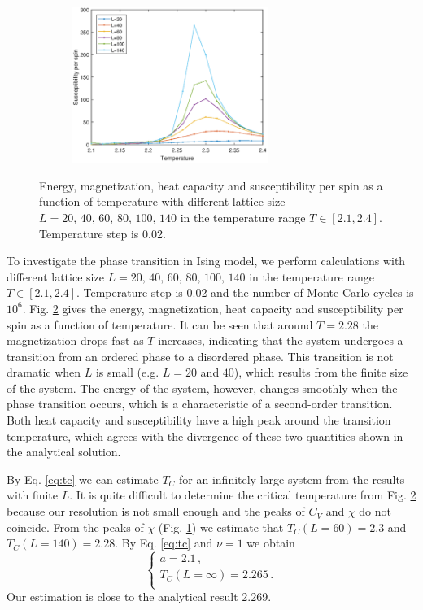 \begin{figure}[tb]
\begin{subfigure}[tb]{0.5\textwidth}
		\caption{}
	\end{subfigure}
	~
	\begin{subfigure}[tb]{0.5\textwidth}
		\centering
		\includegraphics[width=0.7\textwidth]{Tran_sus.eps}		
		\caption{}
		\label{fig:transition_sus}
	\end{subfigure}
	\caption{Energy, magnetization, heat capacity and susceptibility per spin as a function of temperature
	with different lattice size $L=20,\,40,\,60,\,80,\,100,\,140$ in the temperature range $T\in[2.1,2.4]$. 
	Temperature step is 0.02. }
	\label{fig:transition}
\end{figure}
To investigate the phase transition in Ising model, we perform calculations with different lattice size 
$L=20,\,40,\,60,\,80,\,100,\,140$ in the temperature range $T\in[2.1,2.4]$. 
Temperature step is 0.02 and the number of Monte Carlo cycles is $10^6$. 
Fig. \ref{fig:transition} gives the energy, magnetization, heat capacity and susceptibility per spin as a function of temperature. 
It can be seen that around $T=2.28$ the magnetization drops fast as $T$ increases, 
indicating that the system undergoes a transition from an ordered phase to a disordered phase. 
This transition is not dramatic when $L$ is small (e.g. $L=20$ and $40$), which results from the finite size of the system. 
The energy of the system, however, changes smoothly when the phase transition occurs, 
which is a characteristic of a second-order transition. 
Both heat capacity and susceptibility have a high peak around the transition temperature, 
which agrees with the divergence of these two quantities shown in the analytical solution. 
\par
By Eq. \ref{eq:tc} we can estimate $T_C$ for an infinitely large system from the results with finite $L$. 
It is quite difficult to determine the critical temperature from Fig. \ref{fig:transition} 
because our resolution is not small enough and the peaks of $C_V$ and $\chi$ do not coincide. 
From the peaks of $\chi$ (Fig. \ref{fig:transition_sus}) we estimate that $T_C(L=60)=2.3$ and $T_C(L=140)=2.28$. 
By Eq. \ref{eq:tc} and $\nu=1$ we obtain 
\begin{equation}
\left\{
\begin{array}{c}
a=2.1\,,  \\
T_C(L=\infty)=2.265\,.  \\
\end{array}
\right.
\end{equation}
Our estimation is close to the analytical result 2.269. 